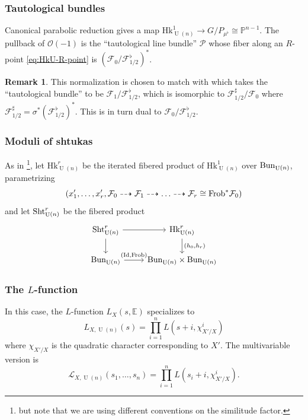 \documentclass[reqno]{amsart}
\numberwithin{equation}{subsection}
\theoremstyle{definition}
\newtheorem{remark}[subsubsection]{Remark}
\def\EE{\mathbb{E}}
\def\PP{\mathbb{P}}
\newcommand\cF{\mathcal{F}}
\newcommand\cO{\mathcal{O}}
\newcommand\cP{\mathcal{P}}
\newcommand{\sL}{{\mathscr{L}}}
\newcommand{\Bun}{\textup{Bun}}
\newcommand\Frob{\textup{Frob}}
\newcommand\Hk{\mathrm{Hk}}
\newcommand\Sht{\textup{Sht}}
\DeclareMathOperator{\U}{U}
\DeclareMathOperator{\Id}{Id}
\begin{document}
\subsubsection{Tautological bundles}  Canonical parabolic reduction gives a map $\Hk_{\U(n)}^1 \rightarrow G/P_{\mu^\flat} \cong \PP^{n-1}$. The pullback of $\cO(-1)$ is the ``tautological line bundle'' $\cP$ whose fiber along an $R$-point \eqref{eq:HkU-R-point} is $(\cF_0/\cF_{1/2}^\flat)^*$. 

\begin{remark}
This normalization is chosen to match with \cite{FYZ, FHM25} which takes the ``tautological bundle'' to be $\cF_1/\cF_{1/2}^\flat$, which is isomorphic to $\cF_{1/2}^{\sharp}/\cF_0$ where $\cF_{1/2}^{\sharp} = \sigma^* (\cF_{1/2}^\flat)^*$. This is in turn dual to $\cF_0/\cF_{1/2}^\flat$.  
\end{remark}



\subsubsection{Moduli of shtukas}

As in \cite[\S 2]{FYZ2}\footnote{but note that we are using different conventions on the similitude factor.}, let $\Hk_{\U(n)}^r$ be the iterated fibered product of $\Hk_{\U(n)}^1$ over $\Bun_{\U(n)}$, parametrizing 
\[
(x_1', \ldots, x_r', \cF_0 \dashrightarrow \cF_1 \dashrightarrow \ldots  \dashrightarrow \cF_r \cong \Frob^* \cF_0)
\]
and let $\Sht_{\U(n)}^r$ be the fibered product 
\[
\begin{tikzcd}
    \Sht_{\U(n)}^r \ar[r] \ar[d] & \Hk_{\U(n)}^r \ar[d, "{(h_0, h_r)}"] \\
    \Bun_{\U(n)} \ar[r, "{(\Id, \Frob)}"] & \Bun_{\U(n)} \times \Bun_{\U(n)}
\end{tikzcd}
\]




\subsubsection{The $L$-function}
In this case, the $L$-function $L_X(s, \EE)$ specializes to 
$$
L_{X,\U(n)}(s)=\prod_{i=1}^n L(s+i,\chi_{X'/X}^{i})
$$
where $\chi_{X'/X}$ is the quadratic character corresponding to $X'$. The multivariable version is 
\[
\sL_{X, \U(n)}(s_1, \ldots, s_n) = \prod_{i=1}^n L(s_i+i,\chi_{X'/X}^{i}).
\]
\end{document}
